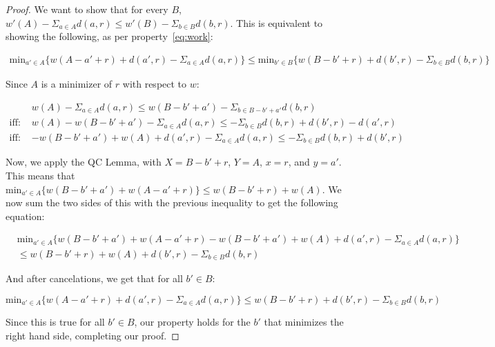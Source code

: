 \begin{proof}
    We want to show that for every $B$, $w'(A) - \Sigma_{a \in A} d(a,r) \leq w'(B) - \Sigma_{b \in B} d(b,r)$. This is equivalent to showing the following, as per property~\eqref{eq:work}:
    
    \begin{equation*}
        \begin{split}
            \mathrm{min}_{a' \in A} \{ w(A - a' + r) + d(a', r) - \Sigma_{a \in A} d(a,r)\} \leq \mathrm{min}_{b' \in B} \{ w(B - b' + r) + d(b', r) - \Sigma_{b \in B} d(b,r)\}
        \end{split}
    \end{equation*}

    Since $A$ is a minimizer of $r$ with respect to $w$:

    \begin{equation*}
        \begin{split}
            &w(A) - \Sigma_{a \in A} d(a,r) \leq w(B-b' + a') - \Sigma_{b \in B - b' + a'} d(b, r) \\
            \text{iff: } &w(A) - w(B-b' + a') - \Sigma_{a \in A} d(a,r) \leq -\Sigma_{b \in B} d(b, r) + d(b', r) - d(a', r) \\
            \text{iff: } &-w(B - b' + a') + w(A) + d(a', r) - \Sigma_{a \in A} d(a,r) \leq -\Sigma_{b \in B} d(b,r) + d(b', r)
        \end{split}
    \end{equation*}

    Now, we apply the QC Lemma, with $X = B -b' + r$, $Y = A$, $x = r$, and $y = a'$. This means that $\mathrm{min}_{a' \in A} \{ w(B - b' + a') + w(A -a' + r)\} \leq w(B - b' + r) + w(A)$. We now sum the two sides of this with the previous inequality to get the following equation:

    \begin{equation*}
        \begin{split}
            &\mathrm{min}_{a' \in A} \{ w(B - b' + a') + w(A -a' + r) - w(B - b' + a') + w(A) + d(a', r) - \Sigma_{a \in A} d(a, r)\} \\
            &\leq w(B - b' + r) + w(A) + d(b' ,r) - \Sigma_{b \in B} d(b, r)
        \end{split}
    \end{equation*}

    And after cancelations, we get that for all $b' \in B$:

    \begin{equation*}
        \mathrm{min}_{a' \in A} \{ w(A - a' + r) + d(a', r) - \Sigma_{a \in A} d(a,r)\} \leq w(B - b' + r) + d(b', r) - \Sigma_{b \in B} d(b,r)
    \end{equation*}

    Since this is true for all $b' \in B$, our property holds for the $b'$ that minimizes the right hand side, completing our proof.
\end{proof}

